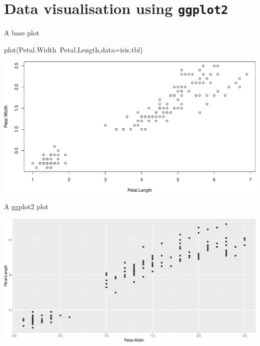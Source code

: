 \documentclass[14pt,ignorenonframetext,]{bredelebeamer}
\newenvironment{Shaded}{\begin{snugshade}}{\end{snugshade}}
\newcommand{\KeywordTok}[1]{\textcolor[rgb]{0.94,0.87,0.69}{#1}}
\newcommand{\DataTypeTok}[1]{\textcolor[rgb]{0.87,0.87,0.75}{#1}}
\newcommand{\StringTok}[1]{\textcolor[rgb]{0.80,0.58,0.58}{#1}}
\newcommand{\OperatorTok}[1]{\textcolor[rgb]{0.94,0.94,0.82}{#1}}
\newcommand{\NormalTok}[1]{\textcolor[rgb]{0.80,0.80,0.80}{#1}}
\begin{document}
\section{\texorpdfstring{Data visualisation using
\texttt{ggplot2}}{Data visualisation using ggplot2}}\label{data-visualisation-using-ggplot2}

\begin{frame}[fragile]{A base plot}

\centering

\begin{Shaded}
\begin{Highlighting}[]
\KeywordTok{plot}\NormalTok{(Petal.Width}\OperatorTok{~}\NormalTok{Petal.Length,}\DataTypeTok{data=}\NormalTok{iris.tbl)}
\end{Highlighting}
\end{Shaded}

\includegraphics{tidyverse_28_03_files/figure-beamer/unnamed-chunk-64-1.pdf}

\end{frame}

\begin{frame}[fragile]{A ggplot2 plot}

\centering

\begin{Shaded}
\end{Shaded}

\includegraphics{tidyverse_28_03_files/figure-beamer/unnamed-chunk-65-1.pdf}

\end{frame}
\end{document}
